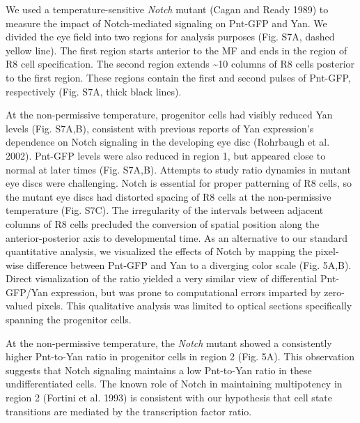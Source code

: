 We used a temperature-sensitive \emph{Notch} mutant (Cagan and Ready 1989) to measure the impact of Notch-mediated signaling on Pnt-GFP and Yan. We divided the eye field into two regions for analysis purposes (Fig. S7A, dashed yellow line). The first region starts anterior to the MF and ends in the region of R8 cell specification. The second region extends \textasciitilde{}10 columns of R8 cells posterior to the first region. These regions contain the first and second pulses of Pnt-GFP, respectively (Fig. S7A, thick black lines).

At the non-permissive temperature, progenitor cells had visibly reduced Yan levels (Fig. S7A,B), consistent with previous reports of Yan expression's dependence on Notch signaling in the developing eye disc (Rohrbaugh et al. 2002). Pnt-GFP levels were also reduced in region 1, but appeared close to normal at later times (Fig. S7A,B). Attempts to study ratio dynamics in mutant eye discs were challenging. Notch is essential for proper patterning of R8 cells, so the mutant eye discs had distorted spacing of R8 cells at the non-permissive temperature (Fig. S7C). The irregularity of the intervals between adjacent columns of R8 cells precluded the conversion of spatial position along the anterior-posterior axis to developmental time. As an alternative to our standard quantitative analysis, we visualized the effects of Notch by mapping the pixel-wise difference between Pnt-GFP and Yan to a diverging color scale (Fig. 5A,B). Direct visualization of the ratio yielded a very similar view of differential Pnt-GFP/Yan expression, but was prone to computational errors imparted by zero-valued pixels. This qualitative analysis was limited to optical sections specifically spanning the progenitor cells.

At the non-permissive temperature, the \emph{Notch} mutant showed a consistently higher Pnt-to-Yan ratio in progenitor cells in region 2 (Fig. 5A). This observation suggests that Notch signaling maintains a low Pnt-to-Yan ratio in these undifferentiated cells. The known role of Notch in maintaining multipotency in region 2 (Fortini et al. 1993) is consistent with our hypothesis that cell state transitions are mediated by the transcription factor ratio.

